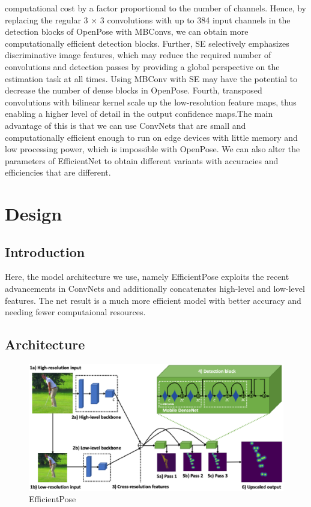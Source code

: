 \documentclass{fisatprojectfinal}
\begin{document}
computational cost by a factor proportional to the number
of channels. Hence, by replacing the regular 3 × 3
convolutions with up to 384 input channels in the detection
blocks of OpenPose with MBConvs, we can obtain more
computationally efficient detection blocks. Further, SE
selectively emphasizes discriminative image features,
which may reduce the required number of convolutions and
detection passes by providing a global perspective on the
estimation task at all times. Using MBConv with SE may
have the potential to decrease the number of dense blocks
in OpenPose. Fourth, transposed convolutions with bilinear
kernel scale up the low-resolution feature maps, thus
enabling a higher level of detail in the output confidence
maps.The main advantage
of this is that we can use ConvNets that are small and
computationally efficient enough to run on edge devices
with little memory and low processing power, which is
impossible with OpenPose. We can also alter the parameters of EfficientNet to obtain different variants
with accuracies and efficiencies that are different.


\chapter{Design}

\section{Introduction}
Here, the model architecture we use, namely EfficientPose exploits the recent advancements in ConvNets
and additionally concatenates high-level and low-level features. The net result is a much more efficient model
with better accuracy and needing fewer computaional resources.

\section{Architecture}

\begin{figure}[h!]
	\begin{center}
	\includegraphics[scale=0.6]{EfficientPose}
	\caption{EfficientPose}
\end{center}
\end{figure}
\end{document}
